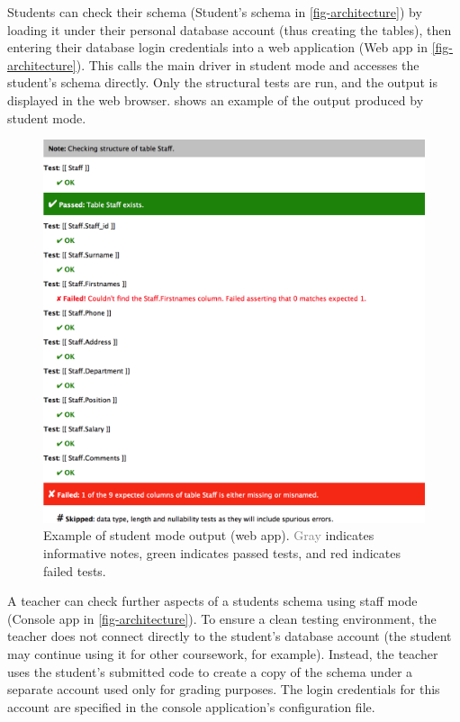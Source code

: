 \documentclass[sigconf, authordraft, capitalise]{acmart}
\begin{document}


Students can check their schema (\textsf{Student's schema} in \cref{fig-architecture}) by loading it under their personal database account (thus creating the tables), then entering their database login credentials into a web application (\textsf{Web app} in \cref{fig-architecture}). This calls the main driver in student mode and accesses the student's schema directly. Only the structural tests are run, and the output is displayed in the web browser.  shows an example of the output produced by student mode.


\begin{figure}
    \includegraphics[width=0.95\columnwidth,keepaspectratio]{images/web_output.png}
    \caption{Example of student mode output (web app). \textcolor{gray}{Gray} indicates informative notes, \textcolor{green!45!black}{green} indicates passed tests, and \textcolor{red!90!black}{red} indicates failed tests.}
    \label{fig-student-output}
\end{figure}



A teacher can check further aspects of a students schema using staff mode (\textsf{Console app} in \cref{fig-architecture}). To ensure a clean testing environment, the teacher does not connect directly to the student's database account (the student may continue using it for other coursework, for example). Instead, the teacher uses the student's submitted code to create a copy of the schema under a separate account used only for grading purposes. The login credentials for this account are specified in the console application's configuration file.
\end{document}
